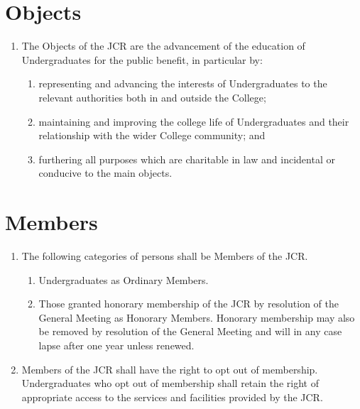 \documentclass[11pt,a4paper, oneside]{memoir}
\begin{document}
	\section{Objects} \label{Art:Objects}
	\begin{enumerate}
		\item The Objects of the JCR are the advancement of the education of Undergraduates for the public benefit, in particular by:
		\begin{enumerate}
			\item representing and advancing the interests of Undergraduates to the relevant authorities both in and outside the College;
			\item maintaining and improving the college life of Undergraduates and their relationship with the wider College community; and
			\item furthering all purposes which are charitable in law and incidental or conducive to the main objects.
		\end{enumerate}
	\end{enumerate}
	\section{Members} \label{Art:Members}
	\begin{enumerate}
		\item The following categories of persons shall be Members of the JCR.
		\begin{enumerate}
			\item Undergraduates as Ordinary Members.
			\item Those granted honorary membership of the JCR by resolution of the General Meeting as Honorary Members.
			Honorary membership may also be removed by resolution of the General Meeting and will in any case lapse after one year unless renewed.
		\end{enumerate}
		\item Members of the JCR shall have the right to opt out of membership.  Undergraduates who opt out of membership shall retain the right of appropriate access to the services and facilities provided by the JCR.
	\end{enumerate}
\end{document}
